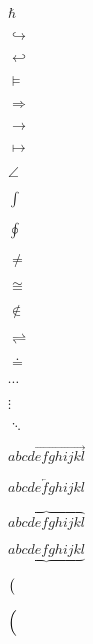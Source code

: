 $\hbar$

$\hookrightarrow$

$\hookleftarrow$

$\models$

$\Longrightarrow$

$\longrightarrow$

$\mapsto$

$\angle$

$\int$

$\oint$

$\neq$

$\cong$

$\notin$

$\rightleftharpoons$

$\doteq$

$\cdots$

$\vdots$

$\ddots$


$\overrightarrow{abcdefghijkl}$

$\overleftarrow{abcdefghijkl}$

$\overbrace{abcdefghijkl}$

$\underbrace{abcdefghijkl}$

$\big{(}$

$\Big{(}$

\newcommand*\mathfonttest{%
\clearpage
\blindtext

$\bar{a}$ M\=aori\=E

$\sqrt[x]{abc} \Big(aaa\Big)$

$[\big[\Big[\bigg[\Bigg[sbgss\Bigg]\bigg]\Big]\big]]$

$\big[sbgss\Big]$

$\sqrt[x]{agaa]}$

$\sqrt[x]{aaa]}$

$\sqrt[x]{\Big[aaa]}$

$\sqrt[x]{\bigg[aaa]}$

$\sqrt[x]{\Bigg[aaa]}$

$\int_{a}^{b}{\displaystyle \int_{a}^{b}}$



\[
\sqrt[x]{
\left[
\left(
\left\{
  \begin{tabular}{ccc}
  1 & 5 & 8 \\
  0 & 2 & 4 \\
  3 & 3 & -8 \\
    3 & 3 & -8 
  \end{tabular}
\right\}
\right)
\right]
}
\]

$\sqrt[x]{deg}$
}

